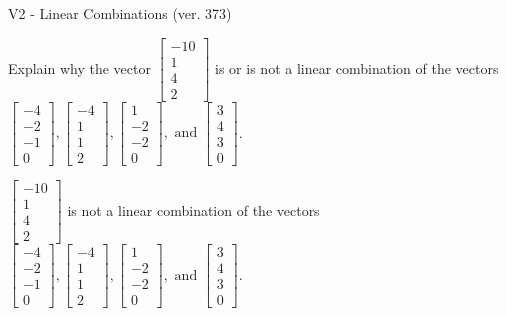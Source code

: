 \begin{exercise}
  \begin{exerciseTitle}V2 - Linear Combinations (ver. 373)\end{exerciseTitle}
  \begin{exerciseStatement}
    Explain why the vector \(\left[\begin{array}{c}
-10 \\
1 \\
4 \\
2
\end{array}\right]\)  is or is not a linear 
	combination of the vectors \(\left[\begin{array}{c}
-4 \\
-2 \\
-1 \\
0
\end{array}\right] , \left[\begin{array}{c}
-4 \\
1 \\
1 \\
2
\end{array}\right] , \left[\begin{array}{c}
1 \\
-2 \\
-2 \\
0
\end{array}\right] , \text{ and } \left[\begin{array}{c}
3 \\
4 \\
3 \\
0
\end{array}\right]\).
	


  \end{exerciseStatement}
  \begin{exerciseAnswer}
   \(\left[\begin{array}{c}
-10 \\
1 \\
4 \\
2
\end{array}\right]\) 
  	 is not  
	a linear combination of the vectors \(\left[\begin{array}{c}
-4 \\
-2 \\
-1 \\
0
\end{array}\right] , \left[\begin{array}{c}
-4 \\
1 \\
1 \\
2
\end{array}\right] , \left[\begin{array}{c}
1 \\
-2 \\
-2 \\
0
\end{array}\right] , \text{ and } \left[\begin{array}{c}
3 \\
4 \\
3 \\
0
\end{array}\right]\).


\end{exerciseAnswer}
\end{exercise}

